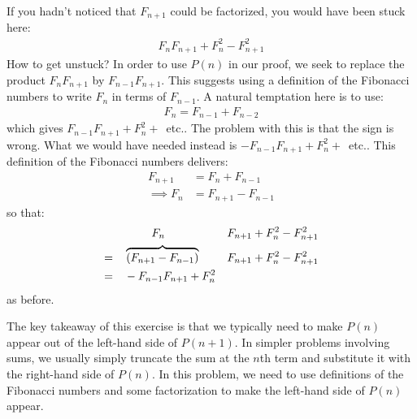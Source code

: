 \documentclass[12pt]{article}
\begin{document}
If you hadn't noticed that $F_{n+1}$ could be factorized, you would have been stuck here:
\begin{align*}
F_{n} F_{n+1} + F_{n}^{2} - F_{n+1}^{2}
\end{align*}
How to get unstuck? In order to use $P(n)$ in our proof, we seek to replace the product $F_{n}F_{n+1}$ by $F_{n-1}F_{n+1}$. This suggests using a definition of the Fibonacci numbers to write $F_{n}$ in terms of $F_{n-1}$. A natural temptation here is to use: 
\begin{align*}
F_{n} = F_{n-1} + F_{n-2}
\end{align*}
which gives $F_{n-1}F_{n+1}+F_{n}^{2}+$~etc.. The problem with this is that the sign is wrong. What we would have needed instead is $-F_{n-1}F_{n+1}+F_{n}^{2}+$~etc.. This definition of the Fibonacci numbers delivers:
\begin{align*}
F_{n+1} & = F_{n} + F_{n-1} \\
\implies 
F_{n} & = F_{n+1} - F_{n-1}
\end{align*}
so that:
\begin{alignat*}{2}
\quad &\makebox[6em]{$F_{n}$}& F_{n+1} + F_{n}^{2} - F_{n+1}^{2} \\
= \quad &\overbrace{(F_{n+1} - F_{n-1})}& F_{n+1} + F_{n}^{2} - F_{n+1}^{2} \\
= \quad & - F_{n-1}F_{n+1} + F_{n}^{2} 
\end{alignat*}
as before.

The key takeaway of this exercise is that we typically need to make $P(n)$ appear out of the left-hand side of $P(n+1)$. In simpler problems involving sums, we usually simply truncate the sum at the $n$th term and substitute it with the right-hand side of $P(n)$. In this problem, we need to use definitions of the Fibonacci numbers and some factorization to make the left-hand side of $P(n)$ appear. 


\clearpage
\end{document}
